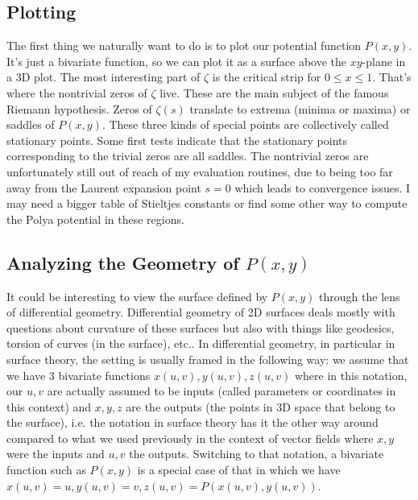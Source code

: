 \documentclass[12pt]{article}
\begin{document}
\subsection{Plotting}
The first thing we naturally want to do is to plot our potential function $P(x,y)$. It's just a bivariate function, so we can plot it as a surface above the $xy$-plane in a 3D plot. The most interesting part of $\zeta$ is the critical strip for $0 \leq x \leq 1$. That's where the nontrivial zeros of $\zeta$ live. These are the main subject of the famous Riemann hypothesis. Zeros of $\zeta(s)$ translate to extrema (minima or maxima) or saddles of $P(x,y)$. These three kinds of special points are collectively called stationary points. Some first tests indicate that the stationary points corresponding to the trivial zeros are all saddles. The nontrivial zeros are unfortunately still out of reach of my evaluation routines, due to being too far away from the Laurent expansion point $s=0$ which leads to convergence issues. I may need a bigger table of Stieltjes constants or find some other way to compute the Polya potential in these regions. 


\subsection{Analyzing the Geometry of $P(x,y)$}
It could be interesting to view the surface defined by $P(x,y)$ through the lens of differential geometry. Differential geometry of 2D surfaces deals mostly with questions about curvature of these surfaces but also with things like geodesics, torsion of curves (in the surface), etc.. In differential geometry, in particular in surface theory, the setting is usually framed in the following way: we assume that we have 3 bivariate functions $x(u,v), y(u,v), z(u,v)$ where in this notation, our $u,v$ are actually assumed to be inputs (called parameters or coordinates in this context) and $x,y,z$ are the outputs (the points in 3D space that belong to the surface), i.e. the notation in surface theory has it the other way around compared to what we used previously in the context of vector fields where $x,y$ were the inputs and $u,v$ the outputs. Switching to that notation, a bivariate function such as $P(x,y)$ is a special case of that in which we have $x(u,v) = u, y(u,v) = v, z(u,v) = P(x(u,v),y(u,v))$.
\end{document}
